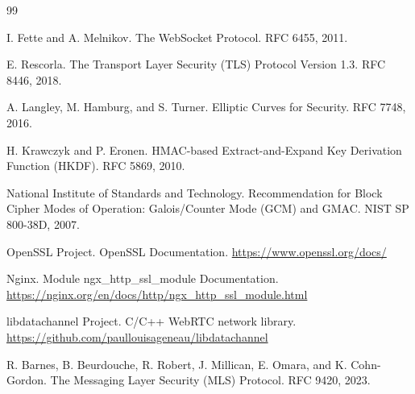 \documentclass[UTF8,a4paper,12pt]{ctexart}
\begin{document}
\begin{thebibliography}{99}

I. Fette and A. Melnikov.
\newblock The WebSocket Protocol.
\newblock RFC 6455, 2011.

E. Rescorla.
\newblock The Transport Layer Security (TLS) Protocol Version 1.3.
\newblock RFC 8446, 2018.

A. Langley, M. Hamburg, and S. Turner.
\newblock Elliptic Curves for Security.
\newblock RFC 7748, 2016.

H. Krawczyk and P. Eronen.
\newblock HMAC-based Extract-and-Expand Key Derivation Function (HKDF).
\newblock RFC 5869, 2010.

National Institute of Standards and Technology.
\newblock Recommendation for Block Cipher Modes of Operation: Galois/Counter Mode (GCM) and GMAC.
\newblock NIST SP 800-38D, 2007.

OpenSSL Project.
\newblock OpenSSL Documentation.
\newblock \url{https://www.openssl.org/docs/}

Nginx.
\newblock Module ngx\_http\_ssl\_module Documentation.
\newblock \url{https://nginx.org/en/docs/http/ngx_http_ssl_module.html}

libdatachannel Project.
\newblock C/C++ WebRTC network library.
\newblock \url{https://github.com/paullouisageneau/libdatachannel}

R. Barnes, B. Beurdouche, R. Robert, J. Millican, E. Omara, and K. Cohn-Gordon.
\newblock The Messaging Layer Security (MLS) Protocol.
\newblock RFC 9420, 2023.

\end{thebibliography}
\end{document}

